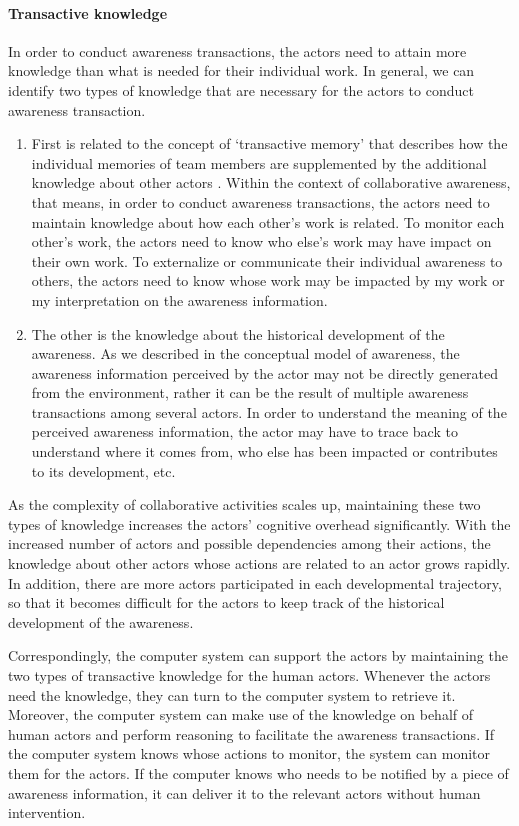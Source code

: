 \paragraph*{Transactive knowledge} %
\label{par:transactive_knowledge}
In order to conduct awareness transactions, the actors need to attain more knowledge than what is needed for their individual work. In general, we can identify two types of knowledge that are necessary for the actors to conduct awareness transaction.
\begin{enumerate}
   \item First is related to the concept of `transactive memory' that describes how the individual memories of team members are supplemented by the additional knowledge about other actors \cite{wegner1987transactive}. Within the context of collaborative awareness, that means, in order to conduct awareness transactions, the actors need to maintain knowledge about how each other's work is related. To monitor each other's work, the actors need to know who else's work may have impact on their own work. To externalize or communicate their individual awareness to others, the actors need to know whose work may be impacted by my work or my interpretation on the awareness information.  
   \item The other is the knowledge about the historical development of the awareness. As we described in the conceptual model of awareness, the awareness information perceived by the actor may not be directly generated from the environment, rather it can be the result of multiple awareness transactions among several actors. In order to understand the meaning of the perceived awareness information, the actor may have to trace back to understand where it comes from, who else has been impacted or contributes to its development, etc.
\end{enumerate}

As the complexity of collaborative activities scales up, maintaining these two types of knowledge increases the actors' cognitive overhead significantly. With the increased number of actors and possible dependencies among their actions, the knowledge about other actors whose actions are related to an actor grows rapidly. In addition, there are more actors participated in each developmental trajectory, so that it becomes difficult for the actors to keep track of the historical development of the awareness.

Correspondingly, the computer system can support the actors by maintaining the two types of transactive knowledge for the human actors. Whenever the actors need the knowledge, they can turn to the computer system to retrieve it. Moreover, the computer system can make use of the knowledge on behalf of human actors and perform reasoning to facilitate the awareness transactions. If the computer system knows whose actions to monitor, the system can monitor them for the actors. If the computer knows who needs to be notified by a piece of awareness information, it can deliver it to the relevant actors without human intervention.

